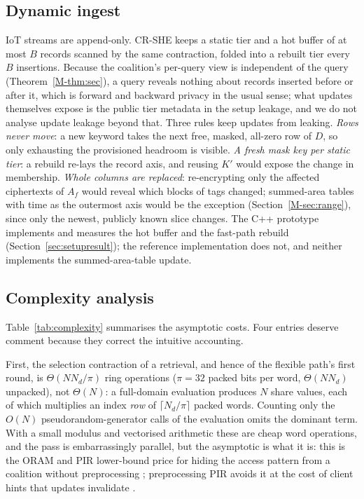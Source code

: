 \documentclass[11pt,a4paper]{article}
\newcommand{\mref}[1]{\ref{M-#1}}
\begin{document}
\subsection{Dynamic ingest}
\label{sec:ingest}
IoT streams are append-only. CR-SHE keeps a static tier and a hot buffer of at
most $B$ records scanned by the same contraction, folded into a rebuilt tier
every $B$ insertions. Because the coalition's per-query view is independent of
the query (Theorem~\mref{thm:sec}), a query reveals nothing about records
inserted before or after it, which is forward and backward privacy in the usual
sense; what updates themselves expose is the public tier metadata in the setup
leakage, and we do not analyse update leakage beyond that.
Three rules keep updates from leaking. \emph{Rows never move}: a new keyword
takes the next free, masked, all-zero row of $D$, so only exhausting the
provisioned headroom is visible. \emph{A fresh mask key per static tier}: a
rebuild re-lays the record axis, and reusing $K'$ would expose the change in
membership. \emph{Whole columns are replaced}: re-encrypting only the affected
ciphertexts of $A_f$ would reveal which blocks of tags changed; summed-area
tables with time as the outermost axis would be the exception
(Section~\mref{sec:range}), since only the newest, publicly known slice changes.
The C++ prototype implements and measures the hot buffer and the fast-path
rebuild (Section~\ref{sec:setupresult}); the reference implementation does
not, and neither implements the summed-area-table update.

\subsection{Complexity analysis}
\label{sec:complexity}

Table~\ref{tab:complexity} summarises the asymptotic costs. Four entries
deserve comment because they correct the intuitive accounting.

First, the selection contraction of a retrieval, and hence of the flexible
path's first round, is $\Theta(N N_d/\pi)$ ring
operations ($\pi=32$ packed bits per word, $\Theta(N N_d)$ unpacked), not $\Theta(N)$: a full-domain evaluation produces $N$ share
values, each of which multiplies an index \emph{row} of $\lceil N_d/\pi\rceil$ packed words. Counting
only the $O(N)$ pseudorandom-generator calls of the evaluation omits the
dominant term. With a small modulus and vectorised arithmetic these are cheap
word operations, and the pass is embarrassingly parallel, but the asymptotic
is what it is: this is the ORAM and PIR lower-bound price for hiding the
access pattern from a coalition without preprocessing
\citep{goldreich1996software,beimel2000reducing}; preprocessing PIR avoids it
at the cost of client hints that updates invalidate
\citep{corrigan2020private}.
\end{document}
